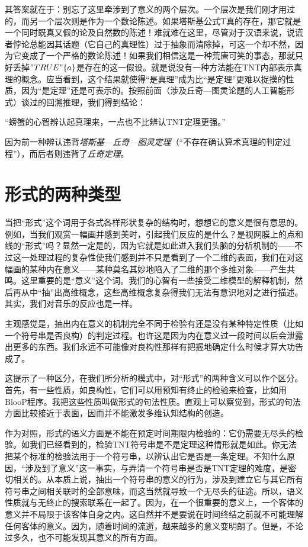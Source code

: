其答案就在于：别忘了这里牵涉到了意义的两个层次。一个层次是我们刚才用过的，而另一个层次则是作为一个数论陈述。如果塔斯基公式T真的存在，那它就是一个同时既真又假的论及自然数的陈述！难就难在这里，尽管对于汉语来说，说谎者悖论总能因其话题（它自己的真理性）过于抽象而清除掉，可这一个却不然，因为它变成了一个严格的数论陈述！如果我们相信这是一种荒唐可笑的事态，那就只好丢掉$"TRUE"\{a\}$是存在的这一假设。就是说没有一种方法能在TNT内部表示真理的概念。应当看到，这个结果就使得“是真理”成为比“是定理”更难以捉摸的性质，因为“是定理”还是可表示的。按照前面（涉及丘奇—图灵论题的人工智能形式）谈过的回溯推理，我们得到结论：

\begin{block}
“螃蟹的心智辨认起真理来，一点也不比辨认TNT定理更强。”
\end{block}
因为前一种辨认违背\emph{塔斯基—丘奇—图灵定理}（“不存在确认算术真理的判定过程”），而后者则违背了\emph{丘奇定理}。

\section{形式的两种类型}

当把“形式”这个词用于各式各样形状复杂的结构时，想想它的意义是很有意思的。例如，当我们观赏一幅画并感到美时，引起我们反应的是什么？是视网膜上的点和线的“形式”吗？显然一定是的，因为它就是如此进入我们头脑的分析机制的——不过这一处理过程的复杂性使我们感到并不只是看到了一个二维的表面，我们在对这幅画的某种内在意义——某种莫名其妙地陷入了二维的那个多维对象——产生共鸣。这里重要的是“意义”这个词。我们的心智有一些接受二维模型的解释机制，然后再从中“抽”出高维概念，这些高维概念复杂得我们无法有意识地对之进行描述。其实，我们对音乐的反应也是一样。

主观感觉是，抽出内在意义的机制完全不同于检验有还是没有某种特定性质（比如一个符号串是否良构）的判定过程。也许这是因为内在意义过一段时间以后会泄露出更多的东西。我们永远不可能像对良构性那样有把握地确定什么时候才算大功告成了。

这提示了一种区分，在我们所分析的模式中，对“形式”的两种含义可以作个区分。首先，有一些性质，如良构性，它们可以用预知有终止的检验来检查，比如用BlooP程序。我把这些性质叫做形式的句法性质。直观上可以察觉到，形式的句法方面比较接近于表面，因而并不能激发多维认知结构的创造。

作为对照，形式的语义方面是不能在预定时间期限内检验的：它仍需要无尽头的检验。如我们已经看到的，检验TNT符号串是不是定理这种情形就是如此。你无法把某个标准的检验法用于一个符号串，以辨认出它是否是一条定理。不知什么原因，“涉及到了意义”这一事实，与弄清一个符号串是否是TNT定理的难度，是密切相关的。从本质上说，抽出一个符号串的意义的行为，涉及到建立它与其它所有符号串之间相关联时的全部意味，而这当然就导致一个无尽头的征途。所以，语义性质就与无终止的搜索联系在一起了。因为，在一个很重要的意义上，一个客体的意义并不局限于该客体自身之内。这自然并不是要说在时间终结之前就不可能理解任何客体的意义。因为，随着时间的流逝，越来越多的意义变明朗了。但是，不论过多久，也不可能发现其意义的所有方面。

